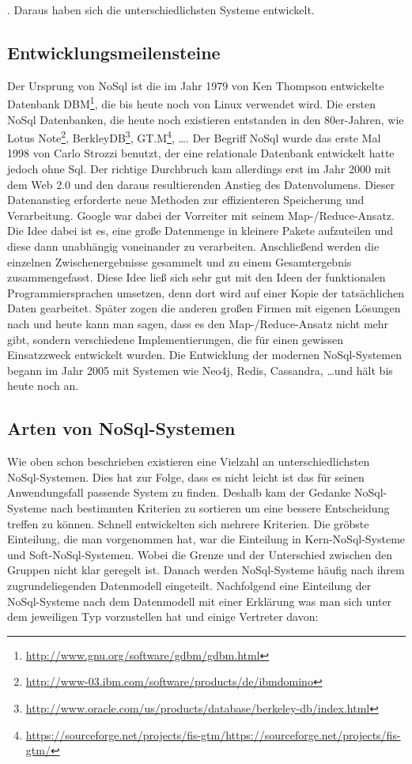 . Daraus haben sich die unterschiedlichsten Systeme entwickelt.

\subsection{Entwicklungsmeilensteine}
Der Ursprung von NoSql ist die im Jahr 1979 von Ken Thompson entwickelte
Datenbank DBM\footnote{\url{http://www.gnu.org/software/gdbm/gdbm.html}}, die
bis heute noch von Linux verwendet wird. Die ersten NoSql Datenbanken, die
heute noch existieren entstanden in den 80er-Jahren, wie Lotus Note\footnote{\url{http://www-03.ibm.com/software/products/de/ibmdomino}},
BerkleyDB\footnote{\url{http://www.oracle.com/us/products/database/berkeley-db/index.html}},
GT.M\footnote{\url{https://sourceforge.net/projects/fis-gtm/https://sourceforge.net/projects/fis-gtm/}}, \ldots .
Der Begriff NoSql wurde das erste Mal 1998 von Carlo Strozzi benutzt, der eine
relationale Datenbank entwickelt hatte jedoch ohne Sql. Der richtige Durchbruch
kam allerdings erst im Jahr 2000 mit dem Web 2.0 und den daraus resultierenden
Anstieg des Datenvolumens. Dieser Datenanstieg erforderte neue Methoden zur
effizienteren Speicherung und Verarbeitung. Google war dabei der Vorreiter mit
seinem Map-/Reduce-Ansatz. Die Idee dabei ist es, eine große Datenmenge in
kleinere Pakete aufzuteilen und diese dann unabhängig voneinander zu verarbeiten.
Anschließend werden die einzelnen Zwischenergebnisse gesammelt und zu einem
Gesamtergebnis zusammengefasst. Diese Idee ließ sich sehr gut mit den Ideen
der funktionalen Programmiersprachen umsetzen, denn dort wird auf einer Kopie
der tatsächlichen Daten gearbeitet. Später zogen die anderen großen Firmen mit
eigenen Lösungen nach und heute kann man sagen, dass es den Map-/Reduce-Ansatz
nicht mehr gibt, sondern verschiedene Implementierungen, die für einen gewissen
Einsatzzweck entwickelt wurden. Die Entwicklung der modernen NoSql-Systemen
begann im Jahr 2005 mit Systemen wie Neo4j, Redis, Cassandra, \ldots und hält
bis heute noch an.

\subsection{Arten von NoSql-Systemen}
Wie oben schon beschrieben existieren eine Vielzahl an unterschiedlichsten
NoSql-Systemen. Dies hat zur Folge, dass es nicht leicht ist das für seinen
Anwendungsfall passende System zu finden. Deshalb kam der Gedanke NoSql-Systeme
nach bestimmten Kriterien zu sortieren um eine bessere Entscheidung treffen zu
können. Schnell entwickelten sich mehrere Kriterien. Die gröbste Einteilung,
die man vorgenommen hat, war die Einteilung in Kern-NoSql-Systeme und
Soft-NoSql-Systemen. Wobei die Grenze und der Unterschied zwischen den Gruppen
nicht klar geregelt ist. Danach werden NoSql-Systeme häufig nach ihrem
zugrundeliegenden Datenmodell eingeteilt. Nachfolgend eine Einteilung der
NoSql-Systeme nach dem Datenmodell mit einer Erklärung was man sich unter dem
jeweiligen Typ vorzustellen hat und einige Vertreter davon:

